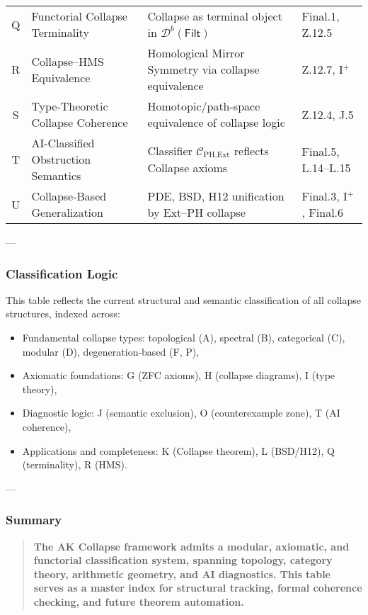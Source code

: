 \documentclass[11pt]{article}
\begin{document}
\begin{axiom}
\begin{axiom}
{{\begin{center}
\begin{tabularx}{\textwidth}{|c|X|X|X|}
Q & Functorial Collapse Terminality & Collapse as terminal object in $\mathcal{D}^b(\mathsf{Filt})$ & Final.1, Z.12.5 \\
R & Collapse–HMS Equivalence & Homological Mirror Symmetry via collapse equivalence & Z.12.7, I$^+$ \\
S & Type-Theoretic Collapse Coherence & Homotopic/path-space equivalence of collapse logic & Z.12.4, J.5 \\
T & AI-Classified Obstruction Semantics & Classifier $\mathcal{C}_{\text{PH,Ext}}$ reflects Collapse axioms & Final.5, L.14–L.15 \\
U & Collapse-Based Generalization & PDE, BSD, H12 unification by Ext–PH collapse & Final.3, I$^+$, Final.6 \\
\hline
\end{tabularx}
\end{center}

---

\subsubsection*{Classification Logic}

This table reflects the current structural and semantic classification of all collapse structures,  
indexed across:

\begin{itemize}
  \item Fundamental collapse types: topological (A), spectral (B), categorical (C), modular (D), degeneration-based (F, P),
  \item Axiomatic foundations: G (ZFC axioms), H (collapse diagrams), I (type theory),
  \item Diagnostic logic: J (semantic exclusion), O (counterexample zone), T (AI coherence),
  \item Applications and completeness: K (Collapse theorem), L (BSD/H12), Q (terminality), R (HMS).
\end{itemize}

---

\subsubsection*{Summary}

\begin{quote}
\textbf{The AK Collapse framework admits a modular, axiomatic, and functorial classification system,  
spanning topology, category theory, arithmetic geometry, and AI diagnostics.  
This table serves as a master index for structural tracking, formal coherence checking,  
and future theorem automation.}
\end{quote}




}}
\end{axiom}
\end{axiom}
\end{document}
